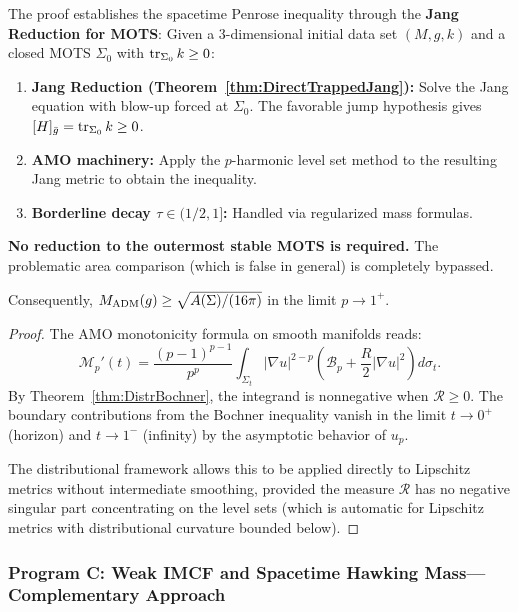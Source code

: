 \begin{remark}
The proof establishes the spacetime Penrose inequality through the \textbf{Jang Reduction for MOTS}: Given a 3-dimensional initial data set $(M,g,k)$ and a closed MOTS $\Sigma_0$ with $\operatorname{tr}_{\Sigma_0} k \ge 0$:
\begin{enumerate}
    \item \textbf{Jang Reduction (Theorem~\ref{thm:DirectTrappedJang}):} Solve the Jang equation with blow-up forced at $\Sigma_0$. The favorable jump hypothesis gives $[H]_{\bar{g}} = \operatorname{tr}_{\Sigma_0} k \ge 0$.
    \item \textbf{AMO machinery:} Apply the $p$-harmonic level set method to the resulting Jang metric to obtain the inequality.
    \item \textbf{Borderline decay $\tau \in (1/2, 1]$:} Handled via regularized mass formulas.
\end{enumerate}
\textbf{No reduction to the outermost stable MOTS is required.} The problematic area comparison (which is false in general) is completely bypassed.
\end{remark}

\begin{corollary}
Consequently, $M_{\mathrm{ADM}}(g) \ge \sqrt{A(\Sigma)/(16\pi)}$ in the limit $p \to 1^+$.
\end{corollary}

\begin{proof}
The AMO monotonicity formula on smooth manifolds reads:
\begin{equation}
    \mathcal{M}_p'(t) = \frac{(p-1)^{p-1}}{p^p} \int_{\Sigma_t} |\nabla u|^{2-p} \left( \mathcal{B}_p + \frac{R}{2} |\nabla u|^2 \right) d\sigma_t.
\end{equation}
By Theorem~\ref{thm:DistrBochner}, the integrand is nonnegative when $\mathcal{R} \ge 0$. The boundary contributions from the Bochner inequality vanish in the limit $t \to 0^+$ (horizon) and $t \to 1^-$ (infinity) by the asymptotic behavior of $u_p$.

The distributional framework allows this to be applied directly to Lipschitz metrics without intermediate smoothing, provided the measure $\mathcal{R}$ has no negative singular part concentrating on the level sets (which is automatic for Lipschitz metrics with distributional curvature bounded below).
\end{proof}

\subsubsection{Program C: Weak IMCF and Spacetime Hawking Mass---Complementary Approach}
\label{sec:ProgramC}

